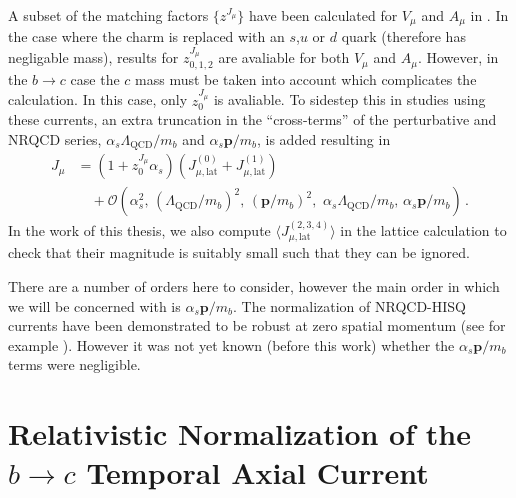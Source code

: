 A subset of the matching factors $\{z^{J_{\mu}}\}$ have been calculated for $V_{\mu}$ and $A_{\mu}$ in \cite{Monahan:2012dq}. In the case where the charm is replaced with an $s$,$u$ or $d$ quark (therefore has negligable mass), results for $z^{J_{\mu}}_{0,1,2}$ are avaliable for both $V_{\mu}$ and $A_{\mu}$. However, in the $b\to c$ case the $c$ mass must be taken into account which complicates the calculation. In this case, only $z^{J_{\mu}}_{0}$ is avaliable. To sidestep this in studies using these currents, an extra truncation in the ``cross-terms'' of the perturbative and NRQCD series, $\alpha_s \Lambda_{\text{QCD}}/m_b$ and $\alpha_s {\textbf{p}}/m_b$, is added resulting in
\begin{align}
  \label{eq:nrqcd-hisq-current-truncate}
  J_{\mu} &= ( 1 + z^{J_{\mu}}_0 \alpha_s )( J_{\mu,\text{lat}}^{(0)} + J_{\mu,\text{lat}}^{(1)} ) \\ \nonumber &\quad + \mathcal{O}(\alpha_s^2,\, (\Lambda_{\text{QCD}}/m_b)^2,\, ({\textbf{p}}/m_b)^2,\,\, \alpha_s \Lambda_{\text{QCD}} / m_b, \, \alpha_s {\textbf{p}}/m_b )\,.
\end{align}
In the work of this thesis, we also compute $\langle J_{\mu,\text{lat}}^{(2,3,4)}\rangle$ in the lattice calculation to check that their magnitude is suitably small such that they can be ignored.

There are a number of orders here to consider, however the main order in which we will be concerned with is $\alpha_s{\textbf{p}}/m_b$. The normalization of NRQCD-HISQ currents have been demonstrated to be robust at zero spatial momentum (see for example \cite{Hughes:2017spc}). However it was not yet known (before this work) whether the $\alpha_s{\textbf{p}}/m_b$ terms were negligible.

\section{Relativistic Normalization of the $b\to c$ Temporal Axial Current}
\label{sec:relativistic}


